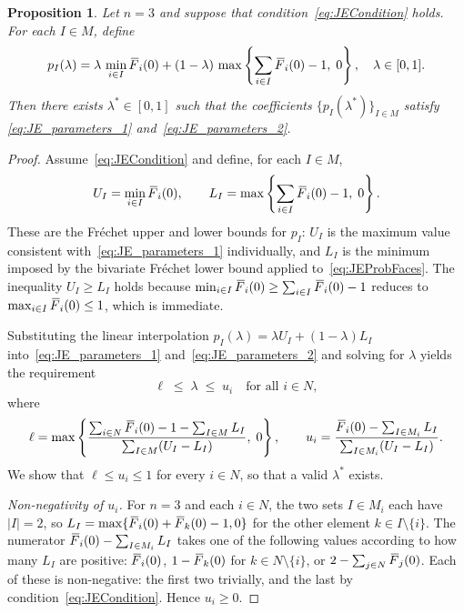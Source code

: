 \documentclass[letterpaper,12pt]{article}
\numberwithin{equation}{section}
\newtheorem{proposition}[theorem]{Proposition}
\newcommand{\N}{{N}}
\newcommand{\M}{{M}}
\newcommand{\I}{{I}}
\newcommand{\F}{\,\overline{\kern-0.175em F\kern-0em}}
\begin{document}
{\begin{proposition}
\label{prop:JE_trivariate}
Let $n=3$ and suppose that condition~\eqref{eq:JECondition} holds. For each
$\I\in\M$, define
\begin{equation}
\label{eq:JE_trivariate_P}
p_{\I}(\lambda)
=\lambda\,\min_{i\in\I}\F_i(0)
+(1-\lambda)\,\max\left\{\sum_{i\in\I}\F_i(0)-1,\;0\right\},
\quad\lambda\in[0,1].
\end{equation}
Then there exists $\lambda^*\in[0,1]$ such that the coefficients
$\{p_\I(\lambda^*)\}_{\I\in\M}$ satisfy
\eqref{eq:JE_parameters_1} and~\eqref{eq:JE_parameters_2}.
\end{proposition}

\begin{proof}
Assume~\eqref{eq:JECondition} and define, for each $\I\in\M$,
\[
U_{\I}=\min_{i\in\I}\F_i(0),
\qquad
L_{\I}=\max\left\{\sum_{i\in\I}\F_i(0)-1,\;0\right\}.
\]
These are the Fr\'{e}chet upper and lower bounds for $p_\I$: $U_\I$ is the maximum
value consistent with~\eqref{eq:JE_parameters_1} individually, and $L_\I$ is the
minimum imposed by the bivariate Fr\'{e}chet lower bound applied
to~\eqref{eq:JEProbFaces}. The inequality $U_\I\ge L_\I$ holds because
$\min_{i\in\I}\F_i(0)\ge\sum_{i\in\I}\F_i(0)-1$ reduces to
$\max_{i\in\I}\F_i(0)\le1$, which is immediate.

Substituting the linear interpolation $p_\I(\lambda)=\lambda U_\I+(1-\lambda)L_\I$
into~\eqref{eq:JE_parameters_1} and~\eqref{eq:JE_parameters_2} and solving for
$\lambda$ yields the requirement
\begin{equation}
\label{eq:JE_trivariate_lambda}
\ell\;\le\;\lambda\;\le\;u_i\quad\text{for all }i\in\N,
\end{equation}
where
\[
\ell=\max\left\{
\frac{\sum_{i\in\N}\F_i(0)-1-\sum_{\I\in\M}L_{\I}}
     {\sum_{\I\in\M}(U_{\I}-L_{\I})},\;0\right\},
\qquad
u_i=\frac{\F_i(0)-\sum_{\I\in\M_i}L_{\I}}
         {\sum_{\I\in\M_i}(U_{\I}-L_{\I})}.
\]
We show that $\ell\le u_i\le1$ for every $i\in\N$, so that a valid $\lambda^*$
exists.

\smallskip
\noindent\textit{Non-negativity of $u_i$.}
For $n=3$ and each $i\in\N$, the two sets $\I\in\M_i$ each have $|\I|=2$, so
$L_\I=\max\{\F_i(0)+\F_k(0)-1,0\}$ for the other element $k\in\I\setminus\{i\}$.
The numerator $\F_i(0)-\sum_{\I\in\M_i}L_\I$ takes one of the following values
according to how many $L_\I$ are positive:
$\F_i(0)$, $1-\F_k(0)$ for $k\in\N\setminus\{i\}$, or
$2-\sum_{j\in\N}\F_j(0)$.
Each of these is non-negative: the first two trivially, and the last by
condition~\eqref{eq:JECondition}. Hence $u_i\ge0$.


\end{proof}}
\end{document}
